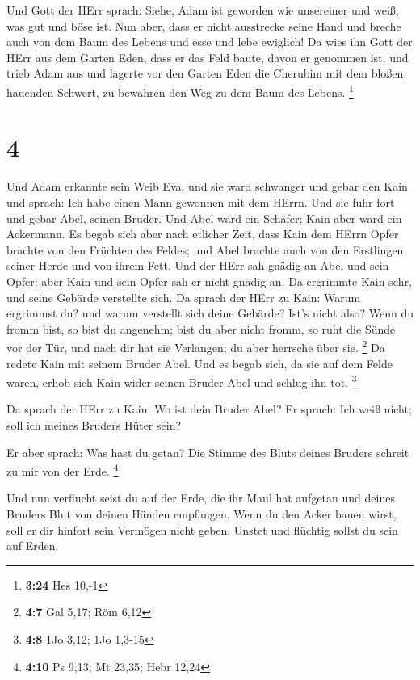  Und Gott der HErr sprach: Siehe, Adam ist geworden wie
unsereiner und weiß, was gut und böse ist. Nun aber, dass er nicht
ausstrecke seine Hand und breche auch von dem Baum des Lebens und esse
und lebe ewiglich!  Da wies ihn Gott der HErr aus dem
Garten Eden, dass er das Feld baute, davon er genommen ist,
 und trieb Adam aus und lagerte vor den Garten Eden die
Cherubim mit dem bloßen, hauenden Schwert, zu bewahren den Weg zu dem
Baum des Lebens. \footnote{\textbf{3:24} Hes 10,-1}

\hypertarget{section-1}{%
\section{4}\label{section-1}}

 Und Adam erkannte sein Weib Eva, und sie ward schwanger und
gebar den Kain und sprach: Ich habe einen Mann gewonnen mit dem HErrn.
 Und sie fuhr fort und gebar Abel, seinen Bruder. Und Abel
ward ein Schäfer; Kain aber ward ein Ackermann.  Es begab
sich aber nach etlicher Zeit, dass Kain dem HErrn Opfer brachte von den
Früchten des Feldes;  und Abel brachte auch von den
Erstlingen seiner Herde und von ihrem Fett. Und der HErr sah gnädig an
Abel und sein Opfer;  aber Kain und sein Opfer sah er nicht
gnädig an. Da ergrimmte Kain sehr, und seine Gebärde verstellte sich.
 Da sprach der HErr zu Kain: Warum ergrimmst du? und warum
verstellt sich deine Gebärde?  Ist's nicht also? Wenn du
fromm bist, so bist du angenehm; bist du aber nicht fromm, so ruht die
Sünde vor der Tür, und nach dir hat sie Verlangen; du aber herrsche über
sie. \footnote{\textbf{4:7} Gal 5,17; Röm 6,12}  Da redete
Kain mit seinem Bruder Abel. Und es begab sich, da sie auf dem Felde
waren, erhob sich Kain wider seinen Bruder Abel und schlug ihn tot.
\footnote{\textbf{4:8} 1Jo 3,12; 1Jo 1,3-15}

 Da sprach der HErr zu Kain: Wo ist dein Bruder Abel? Er
sprach: Ich weiß nicht; soll ich meines Bruders Hüter sein?

 Er aber sprach: Was hast du getan? Die Stimme des Bluts
deines Bruders schreit zu mir von der Erde. \footnote{\textbf{4:10} Ps
  9,13; Mt 23,35; Hebr 12,24}

 Und nun verflucht seist du auf der Erde, die ihr Maul hat
aufgetan und deines Bruders Blut von deinen Händen empfangen.
 Wenn du den Acker bauen wirst, soll er dir hinfort sein
Vermögen nicht geben. Unstet und flüchtig sollst du sein auf Erden.

